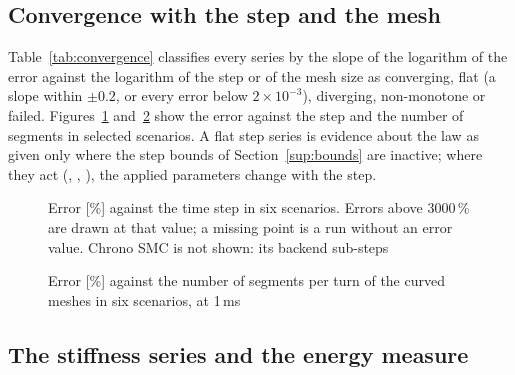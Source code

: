 \subsection{Convergence with the step and the mesh}

Table~\ref{tab:convergence} classifies every series by the slope of the logarithm of the error
against the logarithm of the step or of the mesh size as converging, flat (a slope within
$\pm0.2$, or every error below $2\times10^{-3}$), diverging, non-monotone or failed.
Figures~\ref{fig:convergence-dt} and~\ref{fig:convergence-mesh} show the error against the step
and the number of segments in selected scenarios. A flat step series is evidence about the law
as given only where the step bounds of Section~\ref{sup:bounds} are inactive; where they act
(, , ), the applied parameters change with the step.

\begin{table}[!htbp]
\caption{Convergence series by method: number of scenarios in which the error converges
(conv.), stays flat, is not monotone (n-m.), diverges (div.) or a run of the series did not
finish (fail.), with the step (2 to 0.1\,ms) and with the mesh (32 to 128 segments)}
\label{tab:convergence}
\end{table}

\begin{figure}[!htbp]
\centering
{}
\caption{Error [\%] against the time step in six scenarios. Errors above 3000\,\% are drawn at
that value; a missing point is a run without an error value. Chrono SMC is not shown: its
backend sub-steps}
\label{fig:convergence-dt}
\end{figure}

\begin{figure}[!htbp]
\centering
{}
\caption{Error [\%] against the number of segments per turn of the curved meshes in six
scenarios, at 1\,ms}
\label{fig:convergence-mesh}
\end{figure}

\subsection{The stiffness series and the energy measure}

